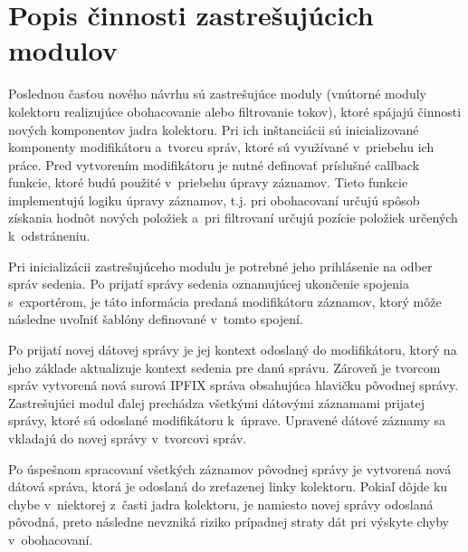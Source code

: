 \section{Popis činnosti zastrešujúcich modulov}

Poslednou časťou nového návrhu sú zastrešujúce moduly (vnútorné moduly kolektoru realizujúce obohacovanie alebo filtrovanie tokov), ktoré spájajú činnosti nových komponentov jadra kolektoru. Pri ich inštanciácii sú inicializované komponenty
modifikátoru a~tvorcu správ, ktoré sú využívané v~priebehu ich práce. Pred vytvorením modifikátoru je nutné definovať príslušné callback funkcie, ktoré budú použité v~priebehu úpravy záznamov. Tieto funkcie implementujú logiku
úpravy záznamov, t.j. pri obohacovaní určujú spôsob získania hodnôt nových položiek a~pri filtrovaní určujú pozície položiek určených k~odstráneniu.

Pri inicializácii zastrešujúceho modulu je potrebné jeho prihlásenie na odber správ sedenia. Po prijatí správy sedenia oznamujúcej ukončenie spojenia s~exportérom, je táto informácia predaná modifikátoru záznamov, ktorý môže následne uvoľniť šablóny definované v~tomto spojení.

Po prijatí novej dátovej správy je jej kontext odoslaný do modifikátoru, ktorý na jeho základe aktualizuje kontext sedenia pre danú správu. Zároveň je tvorcom správ vytvorená nová surová IPFIX správa obsahujúca hlavičku pôvodnej správy. Zastrešujúci modul ďalej prechádza všetkými dátovými záznamami
prijatej správy, ktoré sú odoslané modifikátoru k~úprave. Upravené dátové záznamy sa vkladajú do novej správy v~tvorcovi správ.

Po úspešnom spracovaní všetkých záznamov pôvodnej správy je vytvorená nová dátová správa, ktorá je odoslaná do zreťazenej linky kolektoru. Pokiaľ dôjde ku chybe v~niektorej z~časti jadra kolektoru, je namiesto novej správy odoslaná pôvodná, preto následne nevzniká riziko prípadnej straty
dát pri výskyte chyby v~obohacovaní.

